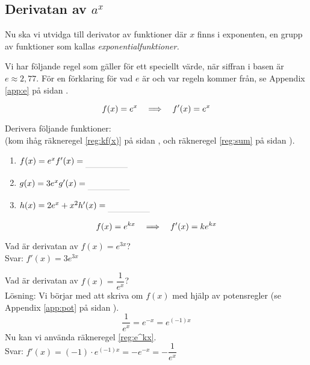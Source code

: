 \documentclass[a4paper, 12pt]{article}
\begin{document}
\subsection{Derivatan av $a^x$}
Nu ska vi utvidga till derivator av funktioner där $x$ finns i exponenten, en grupp av funktioner som kallas \emph{exponentialfunktioner.}

Vi har följande regel som gäller för ett speciellt värde, när siffran i basen är $e \approx 2,77$. För en förklaring för vad $e$ är och var regeln kommer från, se Appendix \ref*{app:e} på sidan \pageref*{app:e}.

\begin{regel}
    \[f(x) = e^x \hspace{1em} \Longrightarrow \hspace{1em} f'(x) = e^x \]
\end{regel}

\begin{uppgifter} 
    \label{upp:e^x}
    Derivera följande funktioner: \\(kom ihåg räkneregel \ref*{reg:kf(x)} på sidan \pageref*{reg:kf(x)}, och räkneregel \ref*{reg:sum} på sidan \pageref*{reg:sum}).
    \begin{multicols}{3}
        \begin{enumerate}
            \item $f(x) = e^x \\ f'(x) \ans$
            \item $g(x) = 3e^x \\ g'(x) \ans$
            \item $h(x) = 2e^x + x^2 \\ h'(x) \ans$
        \end{enumerate}
    \end{multicols}
\end{uppgifter}


\begin{regel}
    \label{reg:e^kx}
    \[ f(x) = e^{kx} \hspace{1em} \Longrightarrow \hspace{1em} f'(x) = ke^{kx} \]
\end{regel}


\begin{exempel}
    Vad är derivatan av $f(x) = e^{3x}$? \\
    Svar: $f'(x) = 3e^{3x}$
\end{exempel}


\begin{exempel}
    Vad är derivatan av $f(x) = \dfrac 1{e^x}$? \\
    Lösning: Vi börjar med att skriva om $f(x)$ med hjälp av potensregler (se Appendix \ref*{app:pot} på sidan \pageref*{app:pot}). 
    \[ \frac 1{e^x} = e^{-x} = e^{(-1)x} \]
    Nu kan vi använda räkneregel \ref*{reg:e^kx}. \\
    Svar: $f'(x) = (-1)\cdot e^{(-1)x} = -e^{-x} = -\dfrac 1{e^x}$
\end{exempel}
\end{document}
